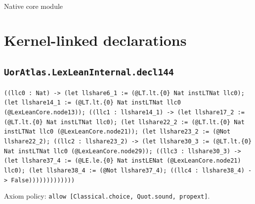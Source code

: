 \documentclass[11pt]{article}
\begin{document}
\begin{center}{\LARGE Native core module}\end{center}
\section*{Kernel-linked declarations}
\subsection*{\texttt{UorAtlas.LexLeanInternal.decl144}}
\noindent\texttt{((llc0 : Nat) -> (let llshare6\_1 := (@LT.lt.\{0\} Nat instLTNat llc0); (let llshare14\_1 := (@LT.lt.\{0\} Nat instLTNat llc0 (@LexLeanCore.node13)); ((llc1 : llshare14\_1) -> (let llshare17\_2 := (@LT.lt.\{0\} Nat instLTNat llc0); (let llshare22\_2 := (@LT.lt.\{0\} Nat instLTNat llc0 (@LexLeanCore.node21)); (let llshare23\_2 := (@Not llshare22\_2); ((llc2 : llshare23\_2) -> (let llshare30\_3 := (@LT.lt.\{0\} Nat instLTNat llc0 (@LexLeanCore.node29)); ((llc3 : llshare30\_3) -> (let llshare37\_4 := (@LE.le.\{0\} Nat instLENat (@LexLeanCore.node21) llc0); (let llshare38\_4 := (@Not llshare37\_4); ((llc4 : llshare38\_4) -> False)))))))))))))}\par
\noindent Axiom policy: \texttt{allow [Classical.choice, Quot.sound, propext]}.\par
\end{document}
